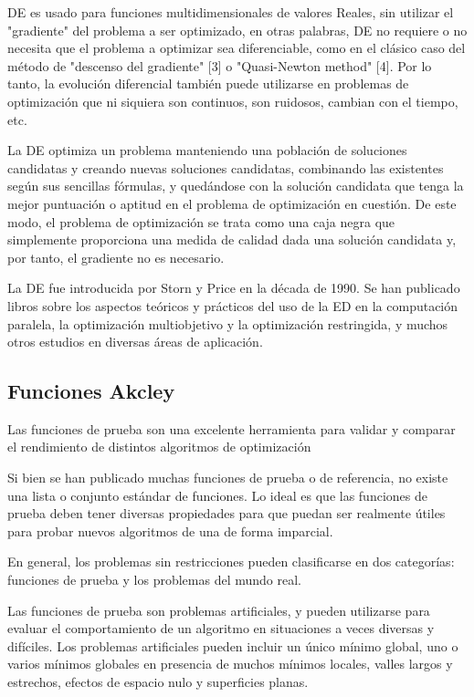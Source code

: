 \documentclass[10pt]{article}
\begin{document}
DE es usado para funciones multidimensionales de valores Reales, sin utilizar el "gradiente" del problema a ser optimizado, en otras palabras, DE no requiere o no necesita que el problema a optimizar sea diferenciable, como en el clásico caso del método de "descenso del gradiente" [3] o "Quasi-Newton method" [4]. Por lo tanto, la evolución diferencial también puede utilizarse en problemas de optimización que ni siquiera son continuos, son ruidosos, cambian con el tiempo, etc.

La DE optimiza un problema manteniendo una población de soluciones candidatas y creando nuevas soluciones candidatas, combinando las existentes según sus sencillas fórmulas, y quedándose con la solución candidata que tenga la mejor puntuación o aptitud en el problema de optimización en cuestión. De este modo, el problema de optimización se trata como una caja negra que simplemente proporciona una medida de calidad dada una solución candidata y, por tanto, el gradiente no es necesario.

La DE fue introducida por Storn y Price en la década de 1990. Se han publicado libros sobre los aspectos teóricos y prácticos del uso de la ED en la computación paralela, la optimización multiobjetivo y la optimización restringida, y muchos otros estudios en diversas áreas de aplicación. 

\subsection{Funciones Akcley}

Las funciones de prueba son una excelente herramienta para validar y comparar el rendimiento de distintos algoritmos de optimización

Si bien se han publicado muchas funciones de prueba o de referencia, no existe una lista o conjunto estándar de funciones. Lo ideal es que las funciones de prueba deben tener diversas propiedades para que puedan ser realmente útiles para probar nuevos algoritmos de una de forma imparcial.

En general, los problemas sin restricciones pueden clasificarse en dos categorías: funciones de prueba y los problemas del mundo real.

Las funciones de prueba son problemas artificiales, y pueden utilizarse para evaluar el comportamiento de un algoritmo en situaciones a veces diversas y difíciles. Los problemas artificiales pueden incluir un único mínimo global, uno o varios mínimos globales en presencia de muchos mínimos locales, valles largos y estrechos, efectos de espacio nulo y superficies planas. 
\end{document}
